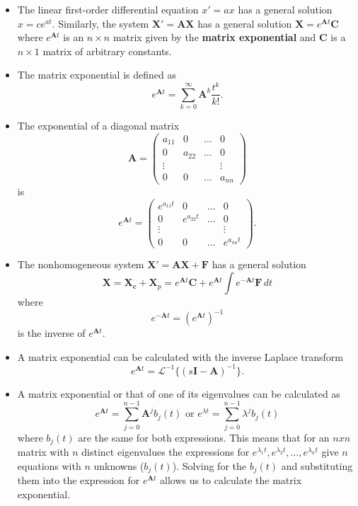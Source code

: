 \documentclass{article}
\begin{document}
\begin{itemize}
  \item The linear first-order differential equation $x' = a x$ has a general solution $x = c e^{a t}$. Similarly, the system $\mathbf{X' = A X}$ has a general solution $\mathbf{X} = e^{\mathbf{A} t} \mathbf{C}$ where $e^{\mathbf{A} t}$ is an $n \times n$ matrix given by the \textbf{matrix exponential} and $\mathbf{C}$ is a $n \times 1$ matrix of arbitrary constants.

  \item The matrix exponential is defined as \[e^{\mathbf{A} t} = \sum_{k = 0}^\infty \mathbf{A}^k \frac{t^k}{k!}.\]

  \item The exponential of a diagonal matrix \[\mathbf{A} = \begin{pmatrix}
            a_{11} & 0      & \ldots & 0      \\
            0      & a_{22} & \ldots & 0      \\
            \vdots &        &        & \vdots \\
            0      & 0      & \ldots & a_{nn}
          \end{pmatrix}\] is \[e^{\mathbf{A} t} = \begin{pmatrix}
            e^{a_{11} t} & 0            & \ldots & 0            \\
            0            & e^{a_{22} t} & \ldots & 0            \\
            \vdots       &              &        & \vdots       \\
            0            & 0            & \ldots & e^{a_{nn} t}
          \end{pmatrix}.\]

  \item The nonhomogeneous system $\mathbf{X' = A X + F}$ has a general solution \[\mathbf{X} = \mathbf{X_c} + \mathbf{X}_p = e^{\mathbf{A} t} \mathbf{C} + e^{\mathbf{A} t} \int e^{-\mathbf{A} t} \mathbf{F} \,dt\] where \[e^{-\mathbf{A} t} = (e^{\mathbf{A} t})^{-1}\] is the inverse of $e^{\mathbf{A} t}$.

  \item A matrix exponential can be calculated with the inverse Laplace transform \[e^{\mathbf{A} t} = \mathcal{L}^{-1} \{ (s \mathbf{I} - \mathbf{A})^{-1} \}.\]

  \item A matrix exponential or that of one of its eigenvalues can be calculated as \[e^{\mathbf{A} t} = \sum_{j = 0}^{n - 1} \mathbf{A}^j b_j(t) \text{ or } e^{\lambda t} = \sum_{j = 0}^{n - 1} \lambda^j b_j(t)\] where $b_j(t)$ are the same for both expressions. This means that for an $n x n$ matrix with $n$ distinct eigenvalues the expressions for $e^{\lambda_1 t}, e^{\lambda_2 t}, \ldots, e^{\lambda_n t}$ give $n$ equations with $n$ unknowns ($b_j(t)$). Solving for the $b_j(t)$ and substituting them into the expression for $e^{\mathbf{A} t}$ allows us to calculate the matrix exponential.
\end{itemize}
\end{document}

